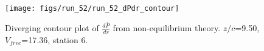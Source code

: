 \begin{figure}[H]
\centering
\texttt{[image: figs/run\_52/run\_52\_dPdr\_contour]}
\caption{Diverging contour plot of $\frac{d\bar{P}}{dr}$ from non-equilibrium theory. $z/c$=9.50, $V_{free}$=17.36, station 6.}
\label{fig:run_52_dPdr_contour}
\end{figure}


